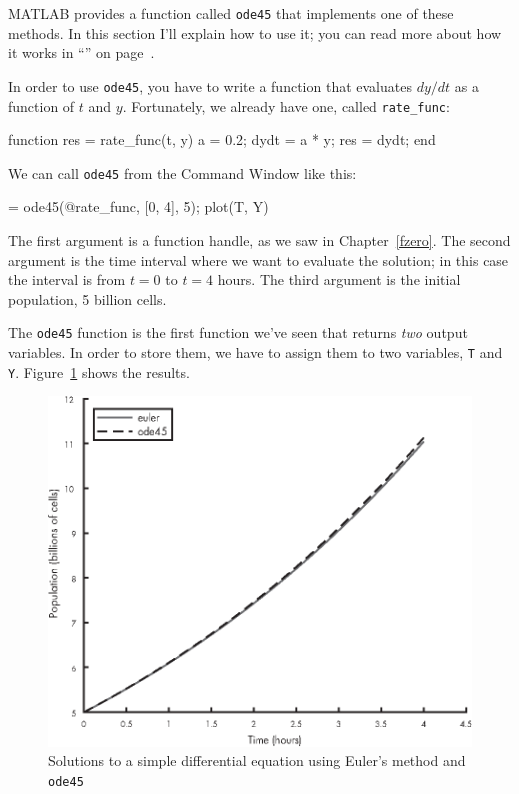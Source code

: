 
MATLAB provides a function called \lstinline{ode45} that implements one of these methods.  In this section I'll explain how to use it; you can read more about how it works in ``'' on page~\pageref{howode45}.


In order to use \lstinline{ode45}, you have to write a function that evaluates $dy/dt$ as a function of $t$ and $y$.  Fortunately, we already have one, called \lstinline{rate_func}:

\begin{code}
function res = rate_func(t, y)
   a = 0.2;
   dydt = a * y;
   res = dydt;
end
\end{code}

We can call \lstinline{ode45} from the Command Window like this:

\begin{code}
[T, Y] = ode45(@rate_func, [0, 4], 5);
plot(T, Y)
\end{code}

The first argument is a function handle, as we saw in Chapter~\ref{fzero}.  The second argument is the time interval where we want to evaluate the solution; in this case the interval is from $t=0$ to $t=4$ hours.  The third argument is the initial population, 5 billion cells.


The \lstinline{ode45} function is the first function we've seen that returns \emph{two} output variables.
In order to store them, we have to assign them to two variables, \lstinline{T} and \lstinline{Y}. Figure~\ref{fig:runge} shows the results.

\begin{figure}[ht]
\centerline{\includegraphics[scale=0.8]{images/figure09_02_new.eps}}
\caption{Solutions to a simple differential equation using Euler's method and \lstinline{ode45}}
\label{fig:runge}
\end{figure}

